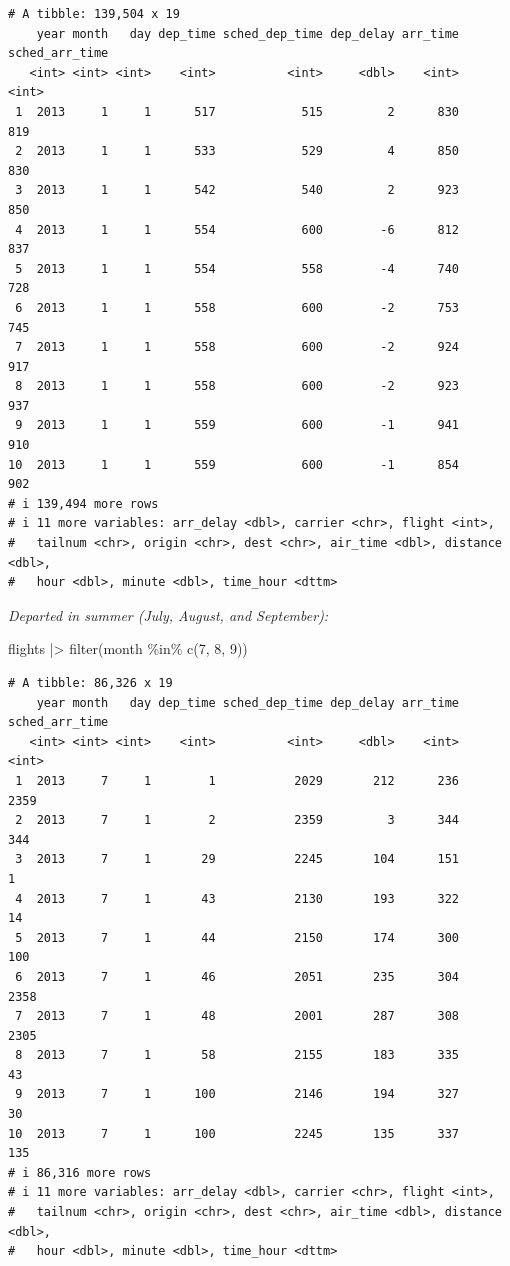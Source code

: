 \documentclass[
  letterpaper,
  DIV=11,
  numbers=noendperiod]{scrreprt}
\newenvironment{Shaded}{\begin{snugshade}}{\end{snugshade}}
\newcommand{\DecValTok}[1]{\textcolor[rgb]{0.68,0.00,0.00}{#1}}
\newcommand{\FunctionTok}[1]{\textcolor[rgb]{0.28,0.35,0.67}{#1}}
\newcommand{\NormalTok}[1]{\textcolor[rgb]{0.00,0.23,0.31}{#1}}
\newcommand{\SpecialCharTok}[1]{\textcolor[rgb]{0.37,0.37,0.37}{#1}}
\begin{document}
\begin{verbatim}
# A tibble: 139,504 x 19
    year month   day dep_time sched_dep_time dep_delay arr_time sched_arr_time
   <int> <int> <int>    <int>          <int>     <dbl>    <int>          <int>
 1  2013     1     1      517            515         2      830            819
 2  2013     1     1      533            529         4      850            830
 3  2013     1     1      542            540         2      923            850
 4  2013     1     1      554            600        -6      812            837
 5  2013     1     1      554            558        -4      740            728
 6  2013     1     1      558            600        -2      753            745
 7  2013     1     1      558            600        -2      924            917
 8  2013     1     1      558            600        -2      923            937
 9  2013     1     1      559            600        -1      941            910
10  2013     1     1      559            600        -1      854            902
# i 139,494 more rows
# i 11 more variables: arr_delay <dbl>, carrier <chr>, flight <int>,
#   tailnum <chr>, origin <chr>, dest <chr>, air_time <dbl>, distance <dbl>,
#   hour <dbl>, minute <dbl>, time_hour <dttm>
\end{verbatim}

\emph{Departed in summer (July, August, and September):}

\begin{Shaded}
\begin{Highlighting}[]
\NormalTok{flights }\SpecialCharTok{|\textgreater{}}
  \FunctionTok{filter}\NormalTok{(month }\SpecialCharTok{\%in\%} \FunctionTok{c}\NormalTok{(}\DecValTok{7}\NormalTok{, }\DecValTok{8}\NormalTok{, }\DecValTok{9}\NormalTok{))}
\end{Highlighting}
\end{Shaded}

\begin{verbatim}
# A tibble: 86,326 x 19
    year month   day dep_time sched_dep_time dep_delay arr_time sched_arr_time
   <int> <int> <int>    <int>          <int>     <dbl>    <int>          <int>
 1  2013     7     1        1           2029       212      236           2359
 2  2013     7     1        2           2359         3      344            344
 3  2013     7     1       29           2245       104      151              1
 4  2013     7     1       43           2130       193      322             14
 5  2013     7     1       44           2150       174      300            100
 6  2013     7     1       46           2051       235      304           2358
 7  2013     7     1       48           2001       287      308           2305
 8  2013     7     1       58           2155       183      335             43
 9  2013     7     1      100           2146       194      327             30
10  2013     7     1      100           2245       135      337            135
# i 86,316 more rows
# i 11 more variables: arr_delay <dbl>, carrier <chr>, flight <int>,
#   tailnum <chr>, origin <chr>, dest <chr>, air_time <dbl>, distance <dbl>,
#   hour <dbl>, minute <dbl>, time_hour <dttm>
\end{verbatim}
\end{document}
